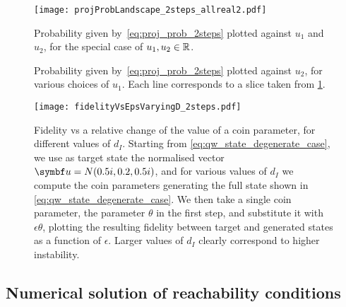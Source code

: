 \begin{figure}[tb]
	\centering
	\texttt{[image: projProbLandscape\_2steps\_allreal2.pdf]}
	\caption{
		Probability given by~\cref{eq:proj_prob_2steps} plotted against $u_1$ and $u_2$, for the special case of $u_1, u_2 \in \mathbb{R}$.
	}
	\label{fig:proj_prob_landscape_plot3d}
\end{figure}
\begin{figure}[tb]
	\centering
	\caption{
		Probability given by~\cref{eq:proj_prob_2steps} plotted against $u_2$, for various choices of $u_1$.
		Each line corresponds to a slice taken from \cref{fig:proj_prob_landscape_plot3d}.}
	\label{fig:proj_prob_landscape_slices}
\end{figure}
\begin{figure}[tb]
	\centering
	\texttt{[image: fidelityVsEpsVaryingD\_2steps.pdf]}
	\caption{
		Fidelity vs a relative change of the value of a coin parameter, for different values of $d_I$.
		Starting from \cref{eq:qw_state_degenerate_case}, we use as target state the normalised vector
		$\bs u = N (0.5 i, 0.2, 0.5 i)$, and for various values of $d_I$ we compute the coin parameters generating the full state shown in \cref{eq:qw_state_degenerate_case}.
		We then take a single coin parameter, the parameter $\theta$ in the first step, and substitute it with $\epsilon \theta$, plotting the resulting fidelity between target and generated states as a function of $\epsilon$.
		Larger values of $d_I$ clearly correspond to higher instability.
	}
	\label{fig:fid_vs_eps_varying_d}
\end{figure}

\subsection{Numerical solution of reachability conditions}
\label{sec:qw_numerical_solution_reachability_conditions}


